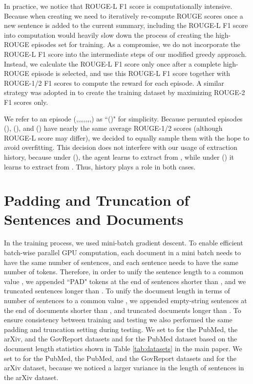 \documentclass[11pt]{article}
\begin{document}
In practice, we notice that ROUGE-L F1 score is computationally intensive. Because when creating  we need to iteratively re-compute ROUGE scores once a new sentence is added to the current summary, including the ROUGE-L F1 score into computation would heavily slow down the process of creating the high-ROUGE episodes set for training. 
As a compromise, we do not incorporate the ROUGE-L F1 score into the intermediate steps of our modified greedy approach. Instead, we calculate the ROUGE-L F1 score only once after a complete high-ROUGE episode is selected, and use this ROUGE-L F1 score together with ROUGE-1/2 F1 scores to compute the reward  for each episode. A similar strategy was adopted in \citet{zhou-etal-2018-neural-document} to create the training dataset by maximizing ROUGE-2 F1 scores only. 


We refer to an episode  (,,,,,,,,) as ``()" for simplicity. Because permuted episodes (), (), and () have nearly the same average ROUGE-1/2 scores (although ROUGE-L score may differ), we decided to equally sample them with the hope to avoid overfitting. This decision does not interfere with our usage of extraction history, because under (), the agent learns to extract  from , while under () it learns to extract  from . Thus, history plays a role in both cases.

\section{Padding and Truncation of Sentences and Documents}
In the training process, we used mini-batch gradient descent. To enable efficient batch-wise parallel GPU computation, each document in a mini batch needs to have the same number of sentences, and each sentence needs to have the same number of tokens. Therefore, in order to unify the sentence length to a common value , we appended ``PAD" tokens at the end of sentences shorter than , and we truncated sentences longer than . To  unify the document length in terms of number of sentences to a common value , we appended empty-string sentences at the end of documents shorter than , and truncated documents longer than . To ensure consistency between training and testing we also performed the same padding and truncation setting during testing. We set  to  for the PubMed, the arXiv, and the GovReport datasets and  for the PubMed dataset based on the document length statistics shown in Table \ref{tab:datasets} in the main paper. We set  to  for the PubMed, the PubMed, and the GovReport datasets and  for the arXiv dataset, because we noticed a larger variance in the length of sentences in the arXiv dataset.
\end{document}

